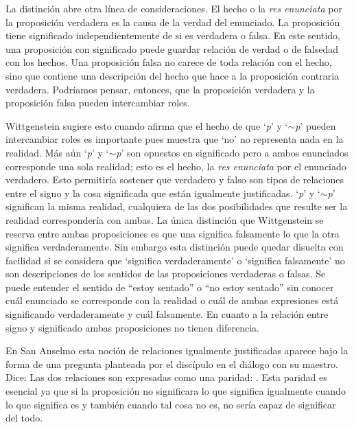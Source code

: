 La distinción abre otra línea de consideraciones. El hecho o la \emph{res
  enunciata} por la proposición verdadera es la causa de la verdad del
enunciado. La proposición tiene significado independientemente de si es
verdadera o falsa. En este sentido, una proposición con significado puede
guardar relación de verdad o de falsedad con los hechos. Una proposición falsa
no carece de toda relación con el hecho, sino que contiene una descripción del
hecho que hace a la proposición contraria verdadera. Podríamos pensar, entonces,
que la proposición verdadera y la proposición falsa pueden intercambiar roles.

Wittgenstein sugiere esto cuando afirma que el hecho de que `\emph{p}' y
`$\sim$\emph{p}' pueden intercambiar roles es importante pues muestra que `no'
no representa nada en la realidad. Más aún `\emph{p}' y `$\sim$\emph{p}' son
opuestos en significado pero a ambos enunciados corresponde una sola realidad;
esto es el hecho, la \emph{res enunciata} por el enunciado verdadero. Esto
permitiría sostener que verdadero y falso son tipos de relaciones entre el signo
y la cosa significada que están igualmente justificadas. `\emph{p}' y
`$\sim$\emph{p}' significan la misma realidad, cualquiera de las dos
posibilidades que resulte ser la realidad correspondería con ambas. La única
distinción que Wittgenstein se reserva entre ambas proposiciones es que una
significa falsamente lo que la otra significa verdaderamente. Sin embargo esta
distinción puede quedar disuelta con facilidad si se considera que `significa
verdaderamente' o `significa falsamente' no son descripciones de los sentidos de
las proposiciones verdaderas o falsas. Se puede entender el sentido de ``estoy
sentado'' o ``no estoy sentado'' sin conocer cuál enunciado se corresponde con
la realidad o cuál de ambas expresiones está significando verdaderamente y cuál
falsamente. En cuanto a la relación entre signo y significado ambas
proposiciones no tienen diferencia.

En San Anselmo esta noción de relaciones igualmente justificadas aparece bajo la
forma de una pregunta planteada por el discípulo en el diálogo con su maestro.
Dice: 
Las dos relaciones son expresadas como una paridad: . Esta paridad es
esencial ya que si la proposición no significara lo que significa igualmente
cuando lo que significa es y también cuando tal cosa no es, no sería capaz de
significar del todo.

